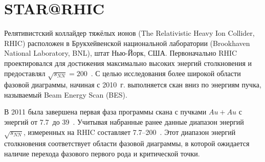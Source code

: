 
\section{STAR@RHIC}


Релятивистский коллайдер тяжёлых ионов (The Relativistic Heavy Ion Collider, RHIC) расположен в Брукхейвенской национальной лаборатории (Brookhaven National Laboratory, BNL), штат Нью-Йорк, США. Первоначально RHIC проектировался для достижения максимально высоких энергий столкновения и предоставлял $\sqrt{s_{NN}}=200$~\GeVperNucl. С целью исследования более широкой области фазовой диаграммы, начиная с 2010~г. выполняется скан вниз по энергиям пучка, называемый Beam Energy Scan (BES).



В 2011 была завершена первая фаза программы скана с пучками $Au+Au$ с энергий от 7.7~\GeVperNucl до 39~\GeVperNucl. Учитывая набранные ранее данные диапазон энергий $\sqrt{s_{NN}}$, измеренных на RHIC составляет 7.7--200~\GeVperNucl. Этот диапазон энергий столкновения соответствует области фазовой диаграммы, в которой ожидается наличие перехода фазового первого рода и критической точки.

